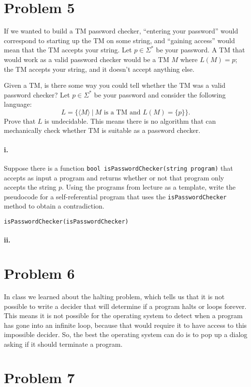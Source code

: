 \documentclass[10pt,letter]{article}
\begin{document}
\section*{Problem 5}
If we wanted to build a TM password checker, “entering your password” would correspond to starting up the TM on some string, and “gaining access” would mean that the TM accepts your string. Let $p \in \Sigma^*$ be your password. A TM that would work as a valid password checker would be a TM $M$ where $L(M) = {p}$; the TM accepts your string, and it doesn't accept anything else.

Given a TM, is there some way you could tell whether the TM was a valid password checker? Let $p \in \Sigma^*$ be your password and consider the following language: $$ L = \{ \langle M \rangle \ | \ M \text{ is a TM and } L(M) = \{p\}\}.$$ Prove that $L$ is undecidable. This means there is no algorithm that can mechanically check whether TM is suitable as a password checker.

\paragraph{i.} Suppose there is a function \texttt{bool isPasswordChecker(string program)} that accepts as input a program and returns whether or not that program only accepts the string $p$. Using the programs from lecture as a template, write the pseudocode for a self-referential program that uses the \texttt{isPasswordChecker} method to obtain a contradiction. 

\texttt{isPasswordChecker(isPasswordChecker)}

\paragraph{ii.} 

\section*{Problem 6}
In class we learned about the halting problem, which tells us that it is not possible to write a decider that will determine if a program halts or loops forever. This means it is not possible for the operating system to detect when a program has gone into an infinite loop, because that would require it to have access to this impossible decider. So, the best the operating system can do is to pop up a dialog asking if it should terminate a program. 

\section*{Problem 7}
\end{document}
